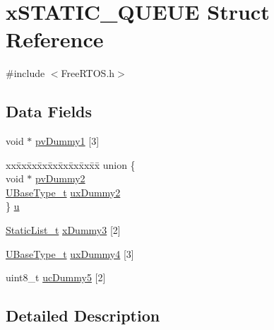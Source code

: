 \hypertarget{structx_s_t_a_t_i_c___q_u_e_u_e}{}\section{x\+S\+T\+A\+T\+I\+C\+\_\+\+Q\+U\+E\+UE Struct Reference}
\label{structx_s_t_a_t_i_c___q_u_e_u_e}


{\ttfamily \#include $<$Free\+R\+T\+O\+S.\+h$>$}

\subsection*{Data Fields}
\begin{DoxyCompactItemize}
\item 
void $\ast$ \hyperlink{structx_s_t_a_t_i_c___q_u_e_u_e_aacf22a66a8d723648995692ec77ee416}{pv\+Dummy1} \mbox{[}3\mbox{]}
\item 
\begin{tabbing}
xx\=xx\=xx\=xx\=xx\=xx\=xx\=xx\=xx\=\kill
union \{\\
\>void $\ast$ \hyperlink{structx_s_t_a_t_i_c___q_u_e_u_e_adb72a02b22a558f6fad381d65af5ac68}{pvDummy2}\\
\>\hyperlink{portmacro_8h_a646f89d4298e4f5afd522202b11cb2e6}{UBaseType\_t} \hyperlink{structx_s_t_a_t_i_c___q_u_e_u_e_ab4e6a2a0bb59ba54d05927e99afd553f}{uxDummy2}\\
\} \hyperlink{structx_s_t_a_t_i_c___q_u_e_u_e_a8a896145a0d9376a7e2713afdd782c41}{u}\\

\end{tabbing}\item 
\hyperlink{_free_r_t_o_s_8h_a9735ad9101a2bd25f83a62089a4acee6}{Static\+List\+\_\+t} \hyperlink{structx_s_t_a_t_i_c___q_u_e_u_e_add0de93e08b632124122850bcd543597}{x\+Dummy3} \mbox{[}2\mbox{]}
\item 
\hyperlink{portmacro_8h_a646f89d4298e4f5afd522202b11cb2e6}{U\+Base\+Type\+\_\+t} \hyperlink{structx_s_t_a_t_i_c___q_u_e_u_e_a502854697731754ce445f6503d14b127}{ux\+Dummy4} \mbox{[}3\mbox{]}
\item 
uint8\+\_\+t \hyperlink{structx_s_t_a_t_i_c___q_u_e_u_e_a541c5044376603540cc3c9cabcbdc5e6}{uc\+Dummy5} \mbox{[}2\mbox{]}
\end{DoxyCompactItemize}


\subsection{Detailed Description}


